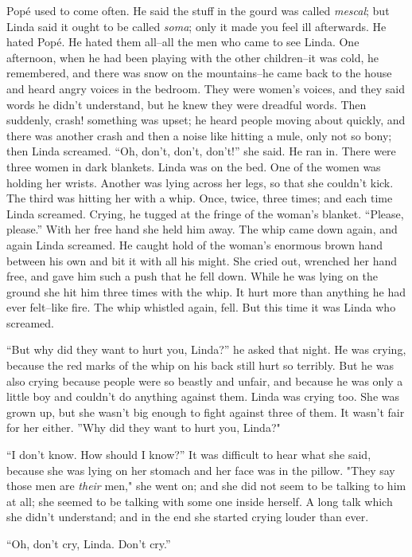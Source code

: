\documentclass[12pt]{report}
\begin{document}
Popé used to come often. He said the stuff in the gourd was called
\emph{mescal}; but Linda said it ought to be called \emph{soma}; only it
made you feel ill afterwards. He hated Popé. He hated them all--all the
men who came to see Linda. One afternoon, when he had been playing with
the other children--it was cold, he remembered, and there was snow on
the mountains--he came back to the house and heard angry voices in the
bedroom. They were women's voices, and they said words he didn't
understand, but he knew they were dreadful words. Then suddenly, crash!
something was upset; he heard people moving about quickly, and there was
another crash and then a noise like hitting a mule, only not so bony;
then Linda screamed. ``Oh, don't, don't, don't!'' she said. He ran in.
There were three women in dark blankets. Linda was on the bed. One of
the women was holding her wrists. Another was lying across her legs, so
that she couldn't kick. The third was hitting her with a whip. Once,
twice, three times; and each time Linda screamed. Crying, he tugged at
the fringe of the woman's blanket. ``Please, please.'' With her free
hand she held him away. The whip came down again, and again Linda
screamed. He caught hold of the woman's enormous brown hand between his
own and bit it with all his might. She cried out, wrenched her hand
free, and gave him such a push that he fell down. While he was lying on
the ground she hit him three times with the whip. It hurt more than
anything he had ever felt--like fire. The whip whistled again, fell. But
this time it was Linda who screamed.

``But why did they want to hurt you, Linda?'' he asked that night. He
was crying, because the red marks of the whip on his back still hurt so
terribly. But he was also crying because people were so beastly and
unfair, and because he was only a little boy and couldn't do anything
against them. Linda was crying too. She was grown up, but she wasn't big
enough to fight against three of them. It wasn't fair for her either.
''Why did they want to hurt you, Linda?"

``I don't know. How should I know?'' It was difficult to hear what she
said, because she was lying on her stomach and her face was in the
pillow. "They say those men are \emph{their} men," she went on; and she
did not seem to be talking to him at all; she seemed to be talking with
some one inside herself. A long talk which she didn't understand; and in
the end she started crying louder than ever.

``Oh, don't cry, Linda. Don't cry.''
\end{document}
